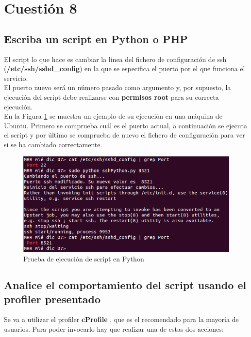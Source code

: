 \section{Cuestión 8}
\subsection{Escriba un script en Python o PHP}
	

	El script lo que hace es cambiar la linea del fichero de configuración de ssh (\textbf{/etc/ssh/sshd\_config}) en la que se especifica el puerto por el que funciona el servicio.
	\\
	
	El puerto nuevo será un número pasado como argumento y, por supuesto, la ejecución del script debe realizarse con \textbf{permisos root} para su correcta ejecución.
	\\
	
	En la Figura \ref{fig:figura81} se muestra un ejemplo de su ejecución en una máquina de Ubuntu. Primero se comprueba cuál es el puerto actual, a continuación se ejecuta el script y por último se comprueba de nuevo el fichero de configuración para ver si se ha cambiado correctamente.
	
	\begin{figure}[H]
		\centering
		\includegraphics[scale=0.8]{figuras/ejercicio8/figura1.png} 
		\caption{Prueba de ejecución de script en Python } 
		\label{fig:figura81}
	\end{figure}
	
\subsection{Analice el comportamiento del script
	usando el profiler presentado}

Se va a utilizar el profiler \textbf{cProfile} \cite{enlace9}, que es el recomendado para la mayoría de usuarios. Para poder invocarlo hay que realizar una de estas dos acciones:

